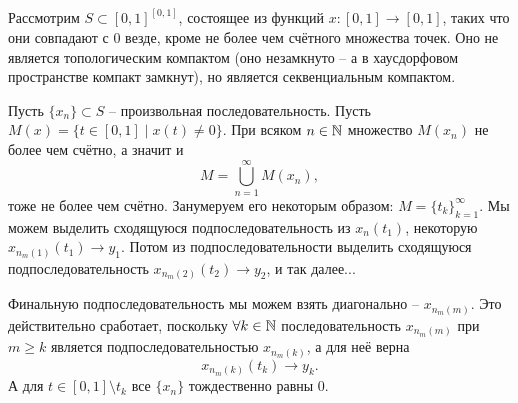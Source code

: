 \begin{example}
    Рассмотрим $S \subset [0, 1]^{[0, 1]}$, состоящее из функций $x\colon [0, 1] \to [0, 1]$, таких что они совпадают с $0$ везде, кроме не более чем счётного множества точек.
    Оно не является топологическим компактом (оно незамкнуто -- а в хаусдорфовом пространстве компакт замкнут), но является секвенциальным компактом.

    Пусть $\{x_n\} \subset S$ -- произвольная последовательность.
    Пусть $M(x) = \{t \in [0, 1] \mid x(t) \neq 0\}$.
    При всяком $n \in \mathbb{N}$ множество $M(x_n)$ не более чем счётно, а значит и
    \[
        M = \bigcup_{n = 1}^{\infty} M(x_n),
    \]
    тоже не более чем счётно.
    Занумеруем его некоторым образом: $M = \{t_k\}_{k = 1}^{\infty}$.
    Мы можем выделить сходящуюся подпоследовательность из $x_n(t_1)$, некоторую $x_{n_m(1)}(t_1) \rightarrow y_1$.
    Потом из подпоследовательности выделить сходящуюся подпоследовательность $x_{n_m(2)}(t_2) \rightarrow y_2$, и так далее...

    Финальную подпоследовательность мы можем взять диагонально -- $x_{n_m(m)}$.
    Это действительно сработает, поскольку $\forall k \in \mathbb{N}$ последовательность $x_{n_m(m)}$ при $m \geq k$ является подпоследовательностью $x_{n_m(k)}$, а для неё верна
    \[
        x_{n_m(k)}(t_k) \rightarrow y_k.
    \]
    А для $t \in [0, 1] \setminus t_{k}$ все $\{x_n\}$ тождественно равны $0$.
\end{example}

